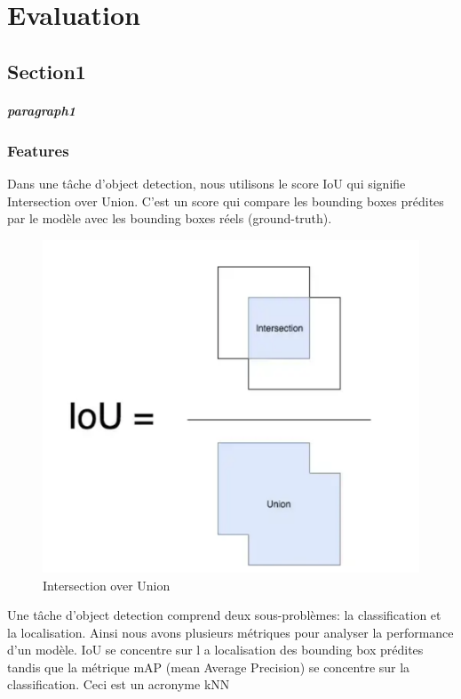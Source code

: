 \chapter{Evaluation}

\section{Section1}
\paragraph{paragraph1}
\subsection{Features}
Dans une tâche d'object detection, nous utilisons le score IoU qui signifie Intersection over Union.
C'est un score qui compare les bounding boxes prédites par le modèle avec les bounding boxes réels (ground-truth).
\begin{figure}[tbh!]
    \centering
    \includegraphics[width=\textwidth]{images/iou.png}
    \caption{Intersection over Union}
    \label{fig:iou}
\end{figure}
Une tâche d'object detection comprend deux sous-problèmes: la classification et la localisation.
Ainsi nous avons plusieurs métriques pour analyser la performance d'un modèle. IoU se concentre sur l
a localisation des bounding box prédites tandis que la métrique mAP (mean Average Precision) 
se concentre sur la classification.
Ceci est un acronyme \acl{kNN}